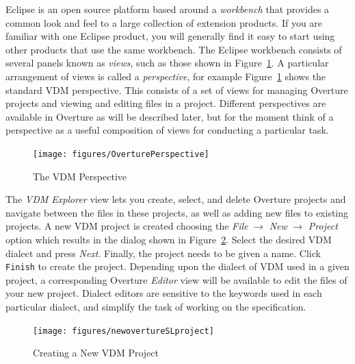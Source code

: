 \documentclass{overturerepchap}
\begin{document}
Eclipse is an open source platform based around a
\emph{workbench} that provides a common look and feel
to a large collection of extension products. If you are
familiar with one Eclipse product, you will generally find it easy to start
using other products that use the same workbench. The Eclipse workbench
consists of several panels known as \emph{views}, such as
those shown in Figure~\ref{fig:userguire:OverturePerspective}.
A particular arrangement of views
is called a \emph{perspective}, for example
Figure~\ref{fig:userguire:OverturePerspective} shows the standard
VDM perspective. This consists of a set of views for managing
Overture projects and viewing and editing files in a
project. Different perspectives are available in Overture as will be
described later, but for the moment think of a perspective as a
useful composition of views for conducting a particular task.

\begin{figure}[!h]
\begin{center}
  \texttt{[image: figures/OverturePerspective]}
  \caption[labelInTOC]{The VDM Perspective}
  \label{fig:userguire:OverturePerspective}
\end{center}
\end{figure}

The \emph{VDM Explorer} view lets you create, select,
and delete Overture projects and navigate between the files in these
projects, as well as adding new files to existing projects. A new VDM
project is created choosing the \emph{File} $ \rightarrow$ \emph{New}
$\rightarrow$ \emph{Project} option which results in the dialog shown in
Figure~\ref{fig:userguide:newOvertureProjectSL}. Select
the desired VDM dialect and press \emph{Next}. Finally, the project
needs to be given a name. Click \texttt{Finish} to create the project.
Depending upon the dialect of VDM used in a given project,
a corresponding Overture \emph{Editor} view will be available to edit the files of
your new project. Dialect editors are sensitive to the keywords used in
each particular dialect, and simplify the task of working on the
specification.

\begin{figure}[!h]
\begin{center}
  \texttt{[image: figures/newovertureSLproject]}
  \caption[labelInTOC]{Creating a New VDM Project}
  \label{fig:userguide:newOvertureProjectSL}
\end{center}
\end{figure}
\end{document}
